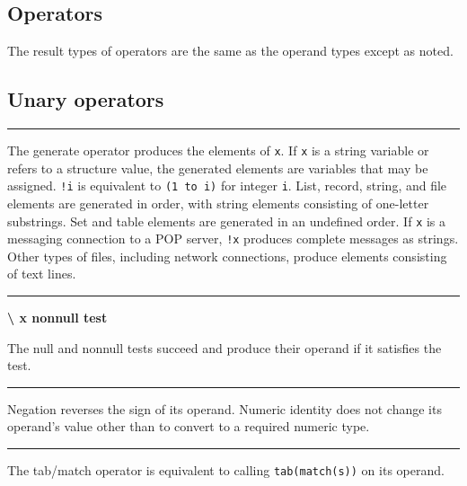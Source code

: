 \subsection*{Operators}

The result types of operators are the same as the
operand types except as noted.

\subsection*{Unary operators}

\bigskip\hrule\vspace{0.1cm}

\noindent
{}The generate
operator produces the elements of \texttt{x}. If
\texttt{x} is a string variable or refers to a structure value, the
generated elements are variables that may be assigned. \texttt{!i} is
equivalent to \texttt{(1 to i)} for integer \texttt{i}. List, record,
string, and file elements are generated in order, with string elements
consisting of one-letter substrings. Set and table elements are
generated in an undefined order. If \texttt{x} is a messaging
connection to a POP server, \texttt{!x} produces complete messages as
strings. Other types of files, including network connections, produce
elements consisting of text lines.

\bigskip\hrule\vspace{0.1cm}

\noindent
{\bf {\textbackslash} x \hfill nonnull test}

\noindent
The null and nonnull tests succeed
and produce their operand if it satisfies the test.

\bigskip\hrule\vspace{0.1cm}


\noindent
Negation reverses the sign of its operand. Numeric identity does not
change its operand's value other than to convert to a
required numeric type.

\bigskip\hrule\vspace{0.1cm}

\noindent
{}The tab/match operator is equivalent to calling
\texttt{tab(match(s))} on its operand.

